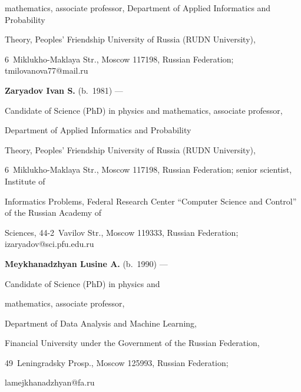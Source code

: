 mathematics, associate professor, Department of Applied Informatics and Probability

Theory, Peoples' Friendship University of Russia (RUDN University), 

6~Miklukho-Maklaya Str., Moscow 117198, Russian Federation; \mbox{tmilovanova77@mail.ru}



\vspace*{3pt}



\noindent

\textbf{Zaryadov Ivan S.} (b.\ 1981) ---

Candidate of Science (PhD) in physics and mathematics, associate professor, 

Department of Applied Informatics and Probability

Theory, Peoples' Friendship University of Russia (RUDN University), 

6~Miklukho-Maklaya Str., Moscow 117198, Russian Federation; senior scientist, Institute of

Informatics Problems, Federal Research Center ``Computer Science and Control'' of the Russian Academy of 

Sciences, 44-2~Vavilov Str., Moscow 119333, Russian Federation; \mbox{izaryadov@sci.pfu.edu.ru}





\vspace*{3pt}





\noindent

\textbf{Meykhanadzhyan Lusine A.} (b.\ 1990) ---

Candidate of Science (PhD) in physics and

mathematics, associate professor, 

Department of Data Analysis and Machine Learning,

Financial University under the Government of the Russian Federation, 

49~Leningradsky Prosp., Moscow 125993, Russian Federation; 

\mbox{lamejkhanadzhyan@fa.ru}





\label{end\stat}



\renewcommand{\bibname}{\protect\rm Литература} 

